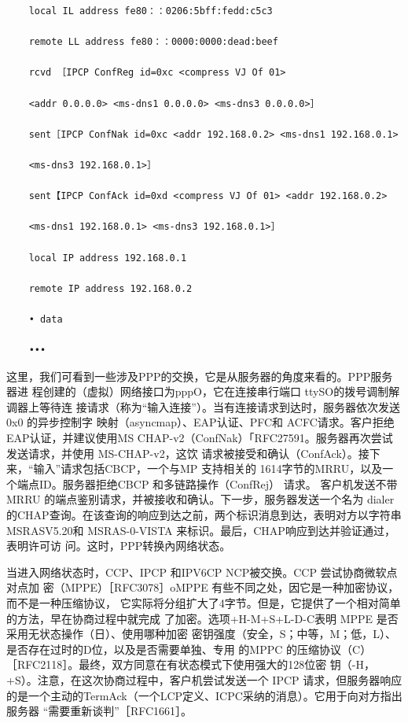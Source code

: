 \begin{verbatim}
    local IL address fe80：：0206:5bff:fedd:c5c3
    
    remote LL address fe80：：0000:0000:dead:beef
    
    rcvd ［IPCP ConfReg id=0xc <compress VJ Of 01>
    
    <addr 0.0.0.0> <ms-dns1 0.0.0.0> <ms-dns3 0.0.0.0>］
    
    sent［IPCP ConfNak id=0xc <addr 192.168.0.2> <ms-dns1 192.168.0.1>
    
    <ms-dns3 192.168.0.1>］
    
    sent【IPCP ConfAck id=0xd <compress VJ Of 01> <addr 192.168.0.2>
    
    <ms-dns1 192.168.0.1> <ms-dns3 192.168.0.1>］
    
    local IP address 192.168.0.1
    
    remote IP address 192.168.0.2
    
    • data
    
    •••
\end{verbatim}

这里，我们可看到一些涉及PPP的交换，它是从服务器的角度来看的。PPP服务器进
程创建的（虚拟）网络接口为pppO，它在连接串行端口 ttySO的拨号调制解调器上等待连
接请求（称为“输入连接”）。当有连接请求到达时，服务器依次发送0x0 的异步控制字
映射（asyncmap）、EAP认证、PFC和 ACFC请求。客户拒绝EAP认证，并建议使用MS
CHAP-v2（ConfNak）「RFC27591。服务器再次尝试发送请求，并使用 MS-CHAP-v2，这饮
请求被接受和确认（ConfAck）。接下来，“输入”请求包括CBCP，一个与MP 支持相关的
1614字节的MRRU，以及一个端点ID。服务器拒绝CBCP 和多链路操作（ConfRej） 请求。
客户机发送不带MRRU 的端点鉴别请求，并被接收和确认。下一步，服务器发送一个名为
dialer 的CHAP查询。在该查询的响应到达之前，两个标识消息到达，表明对方以字符串
MSRASV5.20和 MSRAS-0-VISTA 来标识。最后，CHAP响应到达并验证通过，表明许可访
问。这时，PPP转换內网络状态。

当进入网络状态时，CCP、IPCP 和IPV6CP NCP被交换。CCP 尝试协商微软点对点加
密（MPPE）［RFC3078］oMPPE 有些不同之处，因它是一种加密协议，而不是一种压缩协议，
它实际将分组扩大了4字节。但是，它提供了一个相对简单的方法，早在协商过程中就完成
了加密。选项+H-M+S+L-D-C表明 MPPE 是否采用无状态操作（日）、使用哪种加密
密钥强度（安全，S；中等，M；低，L）、是否存在过时的D位，以及是否需要单独、专用
的MPPC 的压缩协议（C）［RFC2118］。最终，双方同意在有状态模式下使用强大的128位密
钥（-H，+S）。注意，在这次协商过程中，客户机尝试发送一个 IPCP 请求，但服务器响应
的是一个主动的TermAck（一个LCP定义、ICPC采纳的消息）。它用于向对方指出服务器
“需要重新谈判”［RFC1661］。

